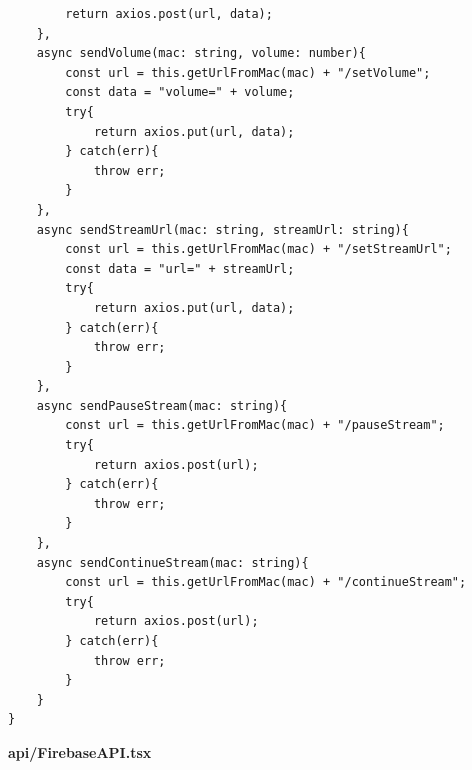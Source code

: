 \documentclass[11pt, twoside]{article}
\begin{document}
\begin{lstlisting}
        return axios.post(url, data);
    },
    async sendVolume(mac: string, volume: number){
        const url = this.getUrlFromMac(mac) + "/setVolume";
        const data = "volume=" + volume;
        try{
            return axios.put(url, data);
        } catch(err){
            throw err;
        }
    },
    async sendStreamUrl(mac: string, streamUrl: string){
        const url = this.getUrlFromMac(mac) + "/setStreamUrl";
        const data = "url=" + streamUrl;
        try{
            return axios.put(url, data);
        } catch(err){
            throw err;
        }
    },
    async sendPauseStream(mac: string){
        const url = this.getUrlFromMac(mac) + "/pauseStream";
        try{
            return axios.post(url);
        } catch(err){
            throw err;
        }
    },
    async sendContinueStream(mac: string){
        const url = this.getUrlFromMac(mac) + "/continueStream";
        try{
            return axios.post(url);
        } catch(err){
            throw err;
        }
    }
}
\end{lstlisting}
\textbf{api/FirebaseAPI.tsx}
\end{document}
